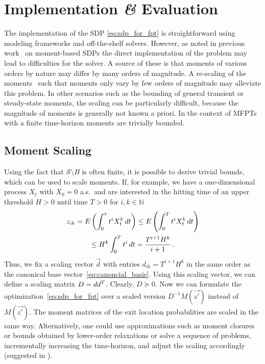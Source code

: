 \section{Implementation \textit{\&} Evaluation}\label{sec:mfpt:evaluation}
The implementation of the \ac{SDP} \eqref{eq:sdp_for_fpt} is
straightforward using
modeling frameworks and off-the-shelf solvers.
However, as noted in previous
work~\parencite{dowdy2018dynamic,sakurai2017convex,dowdy2018bounds,sakurai2019bounding}
on moment-based \acp{SDP}
the direct implementation of the problem may lead to difficulties for
the solver.
A source of these is that moments of various orders by nature
may differ by many orders of magnitude.
A re-scaling of the moments~\parencite{dowdy2018bounds,sakurai2019bounding}
such that moments only vary by few orders of magnitude
may alleviate this problem.
In other scenarios such as the bounding of general transient or
steady-state moments,
the scaling can be particularly difficult,
because the magnitude of moments is generally not known
a priori. In the context of \acp{MFPT} with a finite time-horizon
moments are trivially bounded.

\subsection{Moment Scaling}\label{sec:mfpt:scaling}
Using the fact that
$\mathcal{S}\setminus {B}$ is often finite,
it is possible to derive trivial bounds, which can be used to scale moments.
If, for example, we have a one-dimensional process $X_t$ with $X_0 =
0$ a.s.\ and are interested in the hitting
time of an upper threshold $H>0$ until time $T>0$ for $i,k\in \mathbb N$
\begin{multline*}
  z_{ik} = {E}\left(\int_0^{\tau}t^i X_t^k\,dt\right)\leq{E}\left(\int_0^T t^i
  X_t^k\,dt\right)\\\leq H^k\int_0^T t^i\,dt
  =\frac{T^{i+1}H^k}{i+1}\,.
\end{multline*}
Thus, we fix a scaling vector $\vec d$ with entries $d_{ik}={T^{i+1}H^k}$ in
the same order
as the canonical base vector~\eqref{eq:canoncial_basis}.
Using this scaling vector, we can define a scaling
matrix $D={d}{d}^{T}$.
Clearly, $D \succeq 0$.
Now we can formulate the optimization~\eqref{eq:sdp_for_fpt}
over a scaled version $D^{-1}M(\vec{z'})$ instead of $M(\vec{z'})$.
The moment matrices of the exit location probabilities are scaled in the same
way.
Alternatively, one could use approximations such as moment closures
or bounds obtained by lower-order relaxations or solve a sequence
of problems, incrementally increasing
the time-horizon, and adjust the scaling accordingly (suggested in
\citet{dowdy2018dynamic}).

